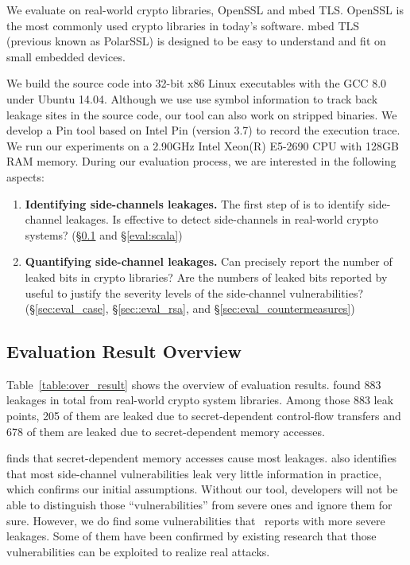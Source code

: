 We evaluate \tool{} on real-world crypto libraries, OpenSSL and mbed TLS\@. OpenSSL
is the most commonly used crypto libraries in today's software. mbed TLS\@
(previous known as PolarSSL) is designed to be easy to understand and fit on
small embedded devices.

We build the source code into 32-bit x86 Linux executables with the GCC 8.0
under Ubuntu 14.04. Although we use use symbol information to track back leakage
sites in the source code, our tool can also work on stripped binaries. We
develop a Pin tool based on Intel Pin (version 3.7) to record the execution
trace. We run our experiments on a 2.90GHz Intel Xeon(R) E5-2690 CPU with 128GB
RAM memory. During our evaluation process, we are interested in the following
aspects:
\begin{enumerate}
    \item  \textbf{Identifying side-channels leakages.}
          The first step of \tool{} is to identify side-channel leakages. Is
          \tool{} effective to detect side-channels in real-world crypto
          systems? (\S\ref{sec:eval_overview} and \S\ref{eval:scala})
    \item  \textbf{Quantifying side-channel leakages.}
          Can \tool{} precisely report the number of leaked bits in crypto
          libraries? Are the numbers of leaked bits reported by \tool{} useful
          to justify the severity levels of the side-channel vulnerabilities?
          (\S\ref{sec:eval_case}, \S\ref{sec::eval_rsa}, and \S\ref{sec:eval_countermeasures})
\end{enumerate}

\subsection{Evaluation Result Overview} \label{sec:eval_overview}
Table~\ref{table:over_result} shows the overview of evaluation results. \tool{} found
883 leakages in total from real-world crypto system libraries. Among those 883
leak points, 205 of them are leaked due to secret-dependent control-flow
transfers and 678 of them are leaked due to secret-dependent memory accesses.

\tool{} finds that secret-dependent memory accesses
cause most leakages. \tool{} also identifies that most side-channel
vulnerabilities leak very little information in practice, which confirms our
initial assumptions.  Without our tool, developers will not be able to
distinguish those ``vulnerabilities'' from severe ones and ignore them for sure.
However, we do find some vulnerabilities that \tool\ reports with more severe
leakages. Some of them have been confirmed by existing research that those
vulnerabilities can be exploited to realize real attacks.

